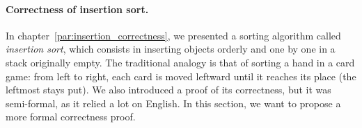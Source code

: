 \medskip

\paragraph{Correctness of insertion sort.}

In chapter~\vref{par:insertion_correctness}, we presented a sorting
algorithm called \emph{insertion sort}, which consists in inserting
objects orderly and one by one in a stack originally empty. The
traditional analogy is that of sorting a hand in a card game: from
left to right, each card is moved leftward until it reaches its place
(the leftmost stays put). We also introduced a proof of its
correctness, but it was semi\hyp{}formal, as it relied a lot on
English. In this section, we want to propose a more formal correctness
proof.

